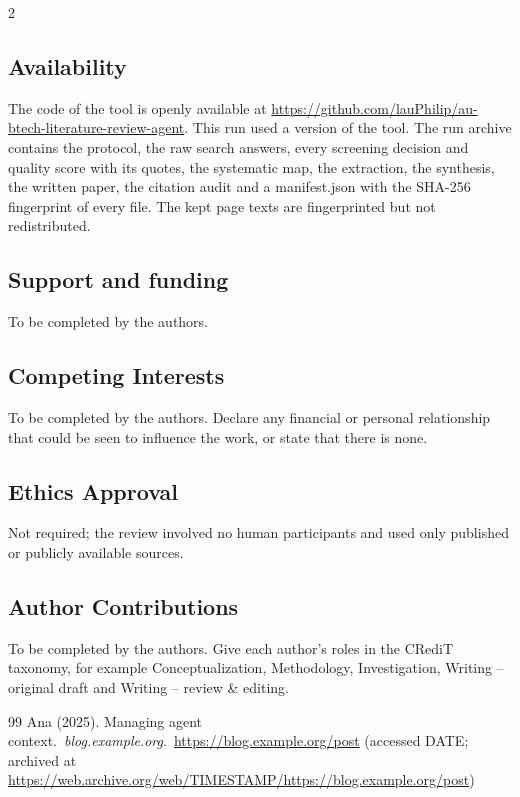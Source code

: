 \documentclass[10pt,a4paper]{article}
\begin{document}
\begin{multicols*}{2}
\subsection{Availability}\label{sec:availability}

The code of the tool is openly available at \url{https://github.com/lauPhilip/au-btech-literature-review-agent}.
This run used a version of the tool.
The run archive contains the protocol, the raw search answers, every screening decision and quality score with its quotes, the systematic map, the extraction, the synthesis, the written paper, the citation audit and a manifest.json with the SHA-256 fingerprint of every file.
The kept page texts are fingerprinted but not redistributed.

\subsection{Support and funding}\label{sec:support-and-funding}

To be completed by the authors.

\subsection{Competing Interests}\label{sec:competing-interests}

To be completed by the authors.
Declare any financial or personal relationship that could be seen to influence the work, or state that there is none.

\subsection{Ethics Approval}\label{sec:ethics-approval}

Not required; the review involved no human participants and used only published or publicly available sources.

\subsection{Author Contributions}\label{sec:author-contributions}

To be completed by the authors.
Give each author's roles in the CRediT taxonomy, for example Conceptualization, Methodology, Investigation, Writing – original draft and Writing – review \& editing.

\end{multicols*}

\clearpage
\begin{thebibliography}{99}
 Ana (2025). Managing agent context.\ \textit{blog.\allowbreak{}example.\allowbreak{}org}.\ \url{https://blog.example.org/post} (accessed DATE; archived at \url{https://web.archive.org/web/TIMESTAMP/https://blog.example.org/post})
\end{thebibliography}
\end{document}
